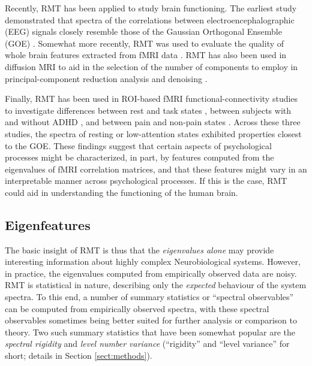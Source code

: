 \documentclass[12pt]{spieman}  %
\begin{document}
\begin{spacing}{2}
Recently, RMT has been applied to study brain functioning. The earliest study
demonstrated that spectra of the correlations between electroencephalographic (EEG) signals closely
resemble those of the Gaussian Orthogonal Ensemble (GOE) \cite{sebaRandomMatrixAnalysis2003}.
Somewhat more recently, RMT was used to evaluate the quality of whole brain features extracted from
fMRI data \cite{voultsidouFeatureEvaluationFMRI2007,verganiRestingStateFMRI2019}. RMT has also
been used in diffusion MRI to aid in the selection of the number of components to employ in
principal-component reduction analysis and denoising
\cite{veraartDenoisingDiffusionMRI2016,verganiRestingStateFMRI2019,ulfarssonDimensionEstimationNoisy2008}.

Finally, RMT has been used in ROI-based fMRI functional-connectivity studies to investigate
differences between rest and task states \cite{wangSpectralPropertiesTemporal2015}, between
subjects with and without ADHD \cite{wangRandomMatrixTheory2016}, and between pain and non-pain
states \cite{matharooSpontaneousBackpainAlters2020}. Across these three studies, the spectra of
resting or low-attention states exhibited properties closest to the GOE. These findings suggest that
certain aspects of psychological processes might be characterized, in part, by features computed
from the eigenvalues of fMRI correlation matrices, and that these features might vary in an
interpretable manner across psychological processes. If this is the case, RMT could aid
in understanding the functioning of the human brain.


\subsection{Eigenfeatures}

The basic insight of RMT is thus that the \textit{eigenvalues alone} may provide interesting
information about highly complex Neurobiological systems. However, in practice, the eigenvalues computed from
empirically observed data are noisy. RMT is statistical in nature, describing only the
\textit{expected} behaviour of the system spectra. To this end, a number of summary statistics or
``spectral observables'' \cite{mehtaRandomMatrices2004} can be computed from empirically observed
spectra, with these spectral observables sometimes being better suited for further analysis or
comparison to theory. Two such summary statistics that have been somewhat popular are the
\textit{spectral rigidity} and \textit{level number variance} (``rigidity'' and ``level variance''
for short; details in Section \ref{sect:methods}).


\end{spacing}
\end{document}
